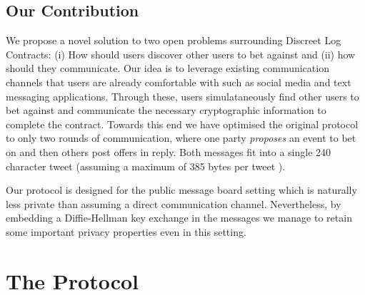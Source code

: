 \documentclass[runningheads]{llncs}
\begin{document}
\subsection{Our Contribution}

We propose a novel solution to two open problems surrounding Discreet Log Contracts: (i) How should users discover other users to bet against and (ii) how should they communicate. Our idea is to leverage existing communication channels that users are already comfortable with such as social media and text messaging applications. Through these, users simulataneously find other users to bet against and communicate the necessary cryptographic information to complete the contract. Towards this end we have optimised the original protocol to only two rounds of communication, where one party \emph{proposes} an event to bet on and then others post offers in reply. Both messages fit into a single 240 character tweet (assuming a maximum of 385 bytes per tweet \cite{base2048}).

Our protocol is designed for the public message board setting which is naturally less private than assuming a direct communication channel. Nevertheless, by embedding a Diffie-Hellman key exchange in the messages we manage to retain some important privacy properties even in this setting.

\section{The Protocol}
\newcommand{\Rec}{\textsf{Rec}}
\newcommand{\bet}{\beta}
\newcommand{\hatsigma}{\hat{\sigma}}
\newcommand{\Fund}{\textsf{Fund}}
\newcommand{\Outcome}{\textsf{Outcome}}
\newcommand{\KeyGen}{\textsf{KeyGen}}
\newcommand{\win}{\textsf{win}}
\newcommand{\Verify}{\textsf{Vrfy}}
\newcommand{\Tx}{\textsf{Tx}}
\newcommand{\EncVer}{\textsf{EncVrfy}}
\newcommand{\Pdleq}{\pcalgostyle{P}_{\textsf{DLEQ}}}
\newcommand{\Vdleq}{\pcalgostyle{V}_{\textsf{DLEQ}}}
\newcommand{\change}{\textsf{change}}
\newcommand{\val}{\textsf{val}}
\newcommand{\OPCHECKMULTISIG}{\texttt{OP\_CHECKMULTISIG}}
\newcommand{\OPCMS}{\texttt{OP\_CMS}_{\text{1-of-2}}}
\newcommand{\fee}{\textsf{fee}}
\newcommand{\Sign}{\textsf{Sign}}
\newcommand{\EncSign}{\textsf{EncSign}}
\newcommand{\Rx}{R_\texttt{x}}
\newcommand{\DecSig}{\textsf{DecSig}}
\newcommand{\TxGen}{\textsf{TxGen}}
\newcommand{\eventid}{\textsf{event\_id}}
\newcommand{\PRG}{\textsf{PRG}}
\newcommand{\HKDF}{H_{\textsf{KDF}}}
\newcommand{\G}{\mathbb{G}}
\newcommand{\Enc}{\textsf{Enc}}
\newcommand{\Dec}{\textsf{Dec}}
\newcommand{\VrfyWitness}{\textsf{VerifyWitness}}
\newcommand{\GenFund}{\textsf{GenBet}}
\newcommand{\GenWitness}{\textsf{Witness}}
\newcommand{\Value}{\textsf{Value}}
\end{document}
